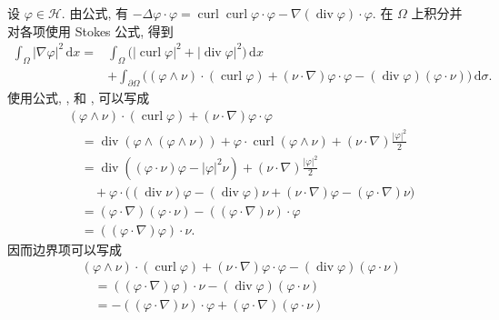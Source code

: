 \begin{Proof}
\begin{itemize}
 设 $\varphi\in\mathcal H$. 由公式, 有
 $-\Delta\varphi\cdot\varphi
 =\operatorname{curl}\operatorname{curl}\varphi\cdot\varphi
 -\nabla(\operatorname{div}\varphi)\cdot\varphi$.
 在 $\Omega$ 上积分并对各项使用 Stokes 公式, 得到
 \begin{equation}
 \begin{aligned}
 \int_\Omega|\nabla\varphi|^2\,\mathrm dx
 ={}&\int_\Omega\bigl(|\operatorname{curl}\varphi|^2
 +|\operatorname{div}\varphi|^2\bigr)\,\mathrm dx\\
 &+\int_{\partial\Omega}\bigl((\varphi\wedge\nu)\cdot(\operatorname{curl}\varphi)
 +(\nu\cdot\nabla)\varphi\cdot\varphi
 -(\operatorname{div}\varphi)(\varphi\cdot\nu)\bigr)\,\mathrm d\sigma.
 \end{aligned}
 \label{eq:chap4-gradient-curl-div-boundary}
 \end{equation}
 使用公式,
 ,
 和
 , 可以写成
 \[
 \begin{aligned}
 &(\varphi\wedge\nu)\cdot(\operatorname{curl}\varphi)
 +(\nu\cdot\nabla)\varphi\cdot\varphi\\
 &\quad=\operatorname{div}(\varphi\wedge(\varphi\wedge\nu))
 +\varphi\cdot\operatorname{curl}(\varphi\wedge\nu)
 +(\nu\cdot\nabla)\frac{|\varphi|^2}{2}\\
 &\quad=\operatorname{div}((\varphi\cdot\nu)\varphi-|\varphi|^2\nu)
 +(\nu\cdot\nabla)\frac{|\varphi|^2}{2}\\
 &\qquad+\varphi\cdot\bigl((\operatorname{div}\nu)\varphi
 -(\operatorname{div}\varphi)\nu+(\nu\cdot\nabla)\varphi-(\varphi\cdot\nabla)\nu\bigr)\\
 &\quad=(\varphi\cdot\nabla)(\varphi\cdot\nu)-((\varphi\cdot\nabla)\nu)\cdot\varphi\\
 &\quad=((\varphi\cdot\nabla)\varphi)\cdot\nu.
 \end{aligned}
 \]
 因而边界项可以写成
 \[
 \begin{aligned}
 &(\varphi\wedge\nu)\cdot(\operatorname{curl}\varphi)
 +(\nu\cdot\nabla)\varphi\cdot\varphi
 -(\operatorname{div}\varphi)(\varphi\cdot\nu)\\
 &\quad=((\varphi\cdot\nabla)\varphi)\cdot\nu-(\operatorname{div}\varphi)(\varphi\cdot\nu)\\
 &\quad=-((\varphi\cdot\nabla)\nu)\cdot\varphi
 +(\varphi\cdot\nabla)(\varphi\cdot\nu)

\end{aligned}\]
\end{itemize}
\end{Proof}
